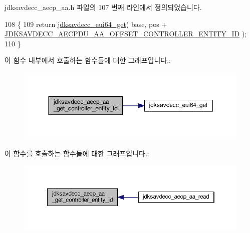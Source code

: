 jdksavdecc\+\_\+aecp\+\_\+aa.\+h 파일의 107 번째 라인에서 정의되었습니다.


\begin{DoxyCode}
108 \{
109     \textcolor{keywordflow}{return} \hyperlink{group__eui64_ga2652311a25a6b91cddbed75c108c7031}{jdksavdecc\_eui64\_get}( base, pos + 
      \hyperlink{group___a_e_c_p___a_a__offsets_gaf07089779823c7d311361b667b1abd6b}{JDKSAVDECC\_AECPDU\_AA\_OFFSET\_CONTROLLER\_ENTITY\_ID} );
110 \}
\end{DoxyCode}


이 함수 내부에서 호출하는 함수들에 대한 그래프입니다.\+:
\nopagebreak
\begin{figure}[H]
\begin{center}
\leavevmode
\includegraphics[width=350pt]{group___a_e_c_p___a_a_gaae2a7787d4f2cac32225db085671d9fb_cgraph}
\end{center}
\end{figure}




이 함수를 호출하는 함수들에 대한 그래프입니다.\+:
\nopagebreak
\begin{figure}[H]
\begin{center}
\leavevmode
\includegraphics[width=350pt]{group___a_e_c_p___a_a_gaae2a7787d4f2cac32225db085671d9fb_icgraph}
\end{center}
\end{figure}


